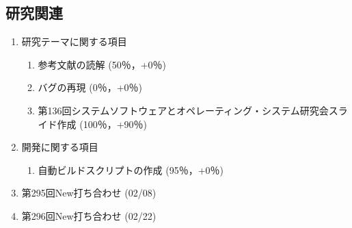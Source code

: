 \documentclass[fleqn, 12pt]{extarticle}
\begin{document}
    \subsection{研究関連}
    \label{sec-2-1}
    \begin{enumerate}

        \item 研究テーマに関する項目
            \hfill
            \label{enum-research1}
            \begin{enumerate}

                \item 参考文献の読解
                    \hfill
                    \label{enum-1-A}
                    (50％，+0％)

                \item バグの再現
                    \hfill
                    \label{enum-1-B}
                    (0％，+0％)

                \item 第136回システムソフトウェアとオペレーティング・システム研究会スライド作成
                    \label{enum-1-D}
                    \newline
                    \hfill
                    (100％，+90％)

            \end{enumerate}

        \item 開発に関する項目
            \hfill
            \label{enum-research2}
            \begin{enumerate}

                \item 自動ビルドスクリプトの作成
                    \hfill
                    \label{enum-2-A}
                    (95％，+0％)

            \end{enumerate}

        \item 第295回New打ち合わせ
            \hfill
            \label{enum-research3}
            (02/08)

        \item 第296回New打ち合わせ
            \hfill
            \label{enum-research3}
            (02/22)

    \end{enumerate}
\end{document}

